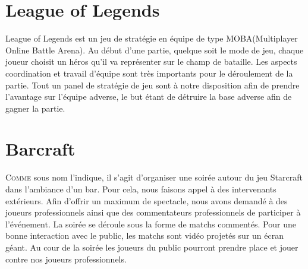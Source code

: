 
\section{League of Legends}%
\label{sec:league_of_legends}

League of Legends est un jeu de stratégie en équipe de type
MOBA(Multiplayer Online Battle Arena). Au début d'une partie, quelque
soit le mode de jeu, chaque joueur choisit un héros qu'il va représenter
sur le champ de bataille. Les aspects coordination et travail d'équipe
sont très importants pour le déroulement de la partie. Tout un panel de
stratégie de jeu sont à notre disposition afin de prendre l'avantage sur
l'équipe adverse, le but étant de détruire la base adverse afin de
gagner la partie.

\section{Barcraft}%
\label{sec:barcraft}

\lettrine{C}{omme} sous nom l'indique, il s'agit d'organiser une soirée
autour du jeu Starcraft dans l'ambiance d'un bar. Pour cela, nous
faisons appel à des intervenants extérieurs. Afin d'offrir un maximum
de spectacle, nous avons demandé à des joueurs professionnels ainsi que
des commentateurs professionnels de participer à l'événement. La soirée
se déroule sous la forme de matchs commentés. Pour une bonne interaction
avec le public, les matchs sont vidéo projetés sur un écran géant. Au
cour de la soirée les joueurs du public pourront prendre place et jouer
contre nos joueurs professionnels.

